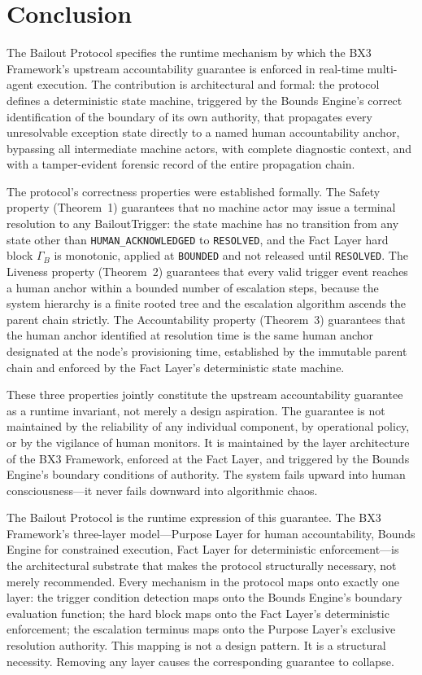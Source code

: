 \documentclass[12pt]{article}
\begin{document}
\section{Conclusion}\label{sec:conclusion}

The Bailout Protocol specifies the runtime mechanism by which the BX3 Framework's upstream accountability guarantee is enforced in real-time multi-agent execution. The contribution is architectural and formal: the protocol defines a deterministic state machine, triggered by the Bounds Engine's correct identification of the boundary of its own authority, that propagates every unresolvable exception state directly to a named human accountability anchor, bypassing all intermediate machine actors, with complete diagnostic context, and with a tamper-evident forensic record of the entire propagation chain.

The protocol's correctness properties were established formally. The Safety property (Theorem~1) guarantees that no machine actor may issue a terminal resolution to any BailoutTrigger: the state machine has no transition from any state other than \texttt{HUMAN\_ACKNOWLEDGED} to \texttt{RESOLVED}, and the Fact Layer hard block $\Gamma_B$ is monotonic, applied at \texttt{BOUNDED} and not released until \texttt{RESOLVED}. The Liveness property (Theorem~2) guarantees that every valid trigger event reaches a human anchor within a bounded number of escalation steps, because the system hierarchy is a finite rooted tree and the escalation algorithm ascends the parent chain strictly. The Accountability property (Theorem~3) guarantees that the human anchor identified at resolution time is the same human anchor designated at the node's provisioning time, established by the immutable parent chain and enforced by the Fact Layer's deterministic state machine.

These three properties jointly constitute the upstream accountability guarantee as a runtime invariant, not merely a design aspiration. The guarantee is not maintained by the reliability of any individual component, by operational policy, or by the vigilance of human monitors. It is maintained by the layer architecture of the BX3 Framework, enforced at the Fact Layer, and triggered by the Bounds Engine's boundary conditions of authority. The system fails upward into human consciousness---it never fails downward into algorithmic chaos.

The Bailout Protocol is the runtime expression of this guarantee. The BX3 Framework's three-layer model---Purpose Layer for human accountability, Bounds Engine for constrained execution, Fact Layer for deterministic enforcement---is the architectural substrate that makes the protocol structurally necessary, not merely recommended. Every mechanism in the protocol maps onto exactly one layer: the trigger condition detection maps onto the Bounds Engine's boundary evaluation function; the hard block maps onto the Fact Layer's deterministic enforcement; the escalation terminus maps onto the Purpose Layer's exclusive resolution authority. This mapping is not a design pattern. It is a structural necessity. Removing any layer causes the corresponding guarantee to collapse.
\end{document}
